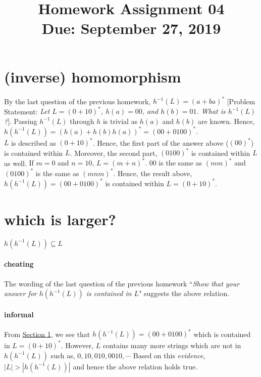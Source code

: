 \documentclass[11pt,letterpaper]{article}
\title{Homework Assignment 04 \\
    \small Due: September 27, 2019}
\begin{document}
\maketitle



\section{(inverse) homomorphism}
\label{sec:1}
By the last question of the previous homework, 
$h^{-1}(L) = (a+ba)^*$ 
[Problem Statement: \textit{Let $L=(0+10)^*$, $h(a)=00$, and $h(b)=01$. What is $h^{-1}(L)$?}]. 
Passing $h^{-1}(L)$ through $h$ is trivial as $h(a)$ and $h(b)$ are known. Hence, $h(h^{-1}(L)) = (h(a) + h(b)h(a))^* = (00+0100)^*$. \\
$L$ is described as $(0+10)^*$. Hence, the first part of the answer above ($(00)^*$) is contained within $L$. Moreover, the second part, $(0100)^*$ is contained within $L$ as well. \small{If $m=0$ and $n=10$, $L=(m+n)^*$. $00$ is the same as $(mm)^*$ and $(0100)^*$ is the same as $(mnm)^*$.} 
Hence, the result above, $h(h^{-1}(L)) = (00+0100)^*$ is contained within $L = (0+10)^*$.

\section{which is larger?}
\begin{center}
    $h(h^{-1}(L)) \subseteq	L$
\end{center}
\paragraph{cheating}
The wording of the last question of the previous homework ``\textit{Show that your answer for $h(h^{-1}(L))$ is contained in $L$}" suggests the above relation.
\paragraph{informal}
From \hyperref[sec:1]{Section 1}, we see that $h(h^{-1}(L)) = (00+0100)^*$ which is contained in $L=(0+10)^*$. However, $L$ contains many more strings which are not in $h(h^{-1}(L))$ such as, $0, 10, 010, 0010, \cdots$ Based on this \textit{evidence}, $|L| > |h(h^{-1}(L))|$ and hence the above relation holds true.
\end{document}
